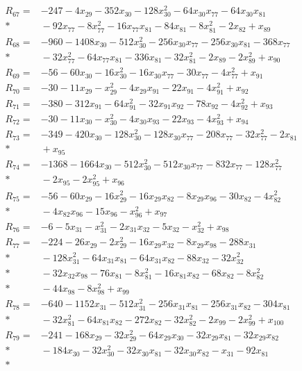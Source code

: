 \begin{align*}
R_{67}={}&-247-4x_{29}-352x_{30}-128x_{30}^{2}-64x_{30}x_{77}-64x_{30}x_{81}\\*
&{}-92x_{77}-8x_{77}^{2}-16x_{77}x_{81}-84x_{81}-8x_{81}^{2}-2x_{82}+x_{89}\\[3pt]
R_{68}={}&-960-1408x_{30}-512x_{30}^{2}-256x_{30}x_{77}-256x_{30}x_{81}-368x_{77}\\*
&{}-32x_{77}^{2}-64x_{77}x_{81}-336x_{81}-32x_{81}^{2}-2x_{89}-2x_{89}^{2}+x_{90}\\[3pt]
R_{69}={}&-56-60x_{30}-16x_{30}^{2}-16x_{30}x_{77}-30x_{77}-4x_{77}^{2}+x_{91}\\[3pt]
R_{70}={}&-30-11x_{29}-x_{29}^{2}-4x_{29}x_{91}-22x_{91}-4x_{91}^{2}+x_{92}\\[3pt]
R_{71}={}&-380-312x_{91}-64x_{91}^{2}-32x_{91}x_{92}-78x_{92}-4x_{92}^{2}+x_{93}\\[3pt]
R_{72}={}&-30-11x_{30}-x_{30}^{2}-4x_{30}x_{93}-22x_{93}-4x_{93}^{2}+x_{94}\\[3pt]
R_{73}={}&-349-420x_{30}-128x_{30}^{2}-128x_{30}x_{77}-208x_{77}-32x_{77}^{2}-2x_{81}\\*
&{}+x_{95}\\[3pt]
R_{74}={}&-1368-1664x_{30}-512x_{30}^{2}-512x_{30}x_{77}-832x_{77}-128x_{77}^{2}\\*
&{}-2x_{95}-2x_{95}^{2}+x_{96}\\[3pt]
R_{75}={}&-56-60x_{29}-16x_{29}^{2}-16x_{29}x_{82}-8x_{29}x_{96}-30x_{82}-4x_{82}^{2}\\*
&{}-4x_{82}x_{96}-15x_{96}-x_{96}^{2}+x_{97}\\[3pt]
R_{76}={}&-6-5x_{31}-x_{31}^{2}-2x_{31}x_{32}-5x_{32}-x_{32}^{2}+x_{98}\\[3pt]
R_{77}={}&-224-26x_{29}-2x_{29}^{2}-16x_{29}x_{32}-8x_{29}x_{98}-288x_{31}\\*
&{}-128x_{31}^{2}-64x_{31}x_{81}-64x_{31}x_{82}-88x_{32}-32x_{32}^{2}\\*
&{}-32x_{32}x_{98}-76x_{81}-8x_{81}^{2}-16x_{81}x_{82}-68x_{82}-8x_{82}^{2}\\*
&{}-44x_{98}-8x_{98}^{2}+x_{99}\\[3pt]
R_{78}={}&-640-1152x_{31}-512x_{31}^{2}-256x_{31}x_{81}-256x_{31}x_{82}-304x_{81}\\*
&{}-32x_{81}^{2}-64x_{81}x_{82}-272x_{82}-32x_{82}^{2}-2x_{99}-2x_{99}^{2}+x_{100}\\[3pt]
R_{79}={}&-241-168x_{29}-32x_{29}^{2}-64x_{29}x_{30}-32x_{29}x_{81}-32x_{29}x_{82}\\*
&{}-184x_{30}-32x_{30}^{2}-32x_{30}x_{81}-32x_{30}x_{82}-x_{31}-92x_{81}\\*

\end{align*}
